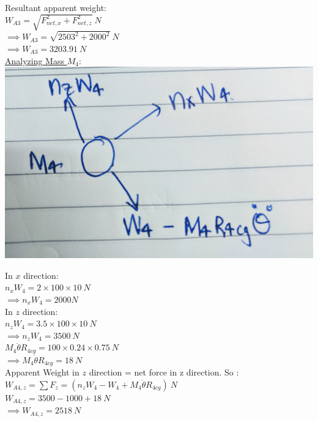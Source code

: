 \documentclass{article}
\begin{document}
\noindent Resultant apparent weight: \\
$W_{A3}= \sqrt{F_{net,x}^2+ F_{net,z}^2}\ N$\\
$\implies W_{A3}= \sqrt{2503^2+ 2000^2}\ N$\\
$\implies W_{A3}= 3203.91\ N$\\

\noindent \underline{Analyzing Mass $M_4$}:\\

\includegraphics[scale=0.05]{m4.jpg}

\noindent In $x$ direction:\\

\noindent $n_xW_4 = 2 \times 100 \times 10\ N$\\
$\implies n_xW_4= 2000 N $\\

\noindent In $z$ direction: \\

\noindent $n_zW_4= 3.5 \times 100 \times 10\ N$\\
$\implies n_zW_4 = 3500\ N$\\

\noindent $M_4\ddot{\theta}R_{4cg}=100 \times 0.24 \times 0.75\ N $\\
$\implies M_4\ddot{\theta}R_{4cg}= 18\ N $\\

\noindent Apparent Weight in $z$ direction = net force in z direction. So : \\
$W_{A4,z}=\sum F_z = (n_zW_4-W_4+ M_4\ddot{\theta}R_{4cg})\ N$\\
$W_{A4,z}= 3500-1000+18 \ N$\\
$\implies W_{A4,z}= 2518\ N$\\
\end{document}
